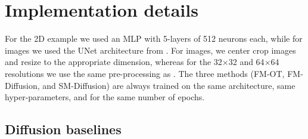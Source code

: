 \documentclass{article}
\begin{document}
\section{Implementation details}
\label{A:implementation-details}

For the 2D example we used an MLP with 5-layers of 512 neurons each, while for images we used the UNet architecture from \citet{dhariwal2021diffusion}. 
For images, we center crop images and resize to the appropriate dimension, whereas for the 32$\times$32 and 64$\times$64 resolutions we use the same pre-processing as \citep{chrabaszcz2017downsampled}. 
The three methods (FM-OT, FM-Diffusion, and SM-Diffusion) are always trained on the same architecture, same hyper-parameters, and for the same number of epochs.

\subsection{Diffusion baselines}\label{a:dif_baselines}
\end{document}
